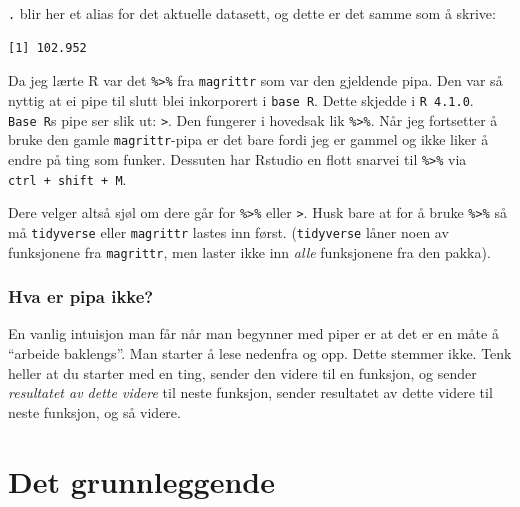 \documentclass[
  letterpaper,
  DIV=11,
  numbers=noendperiod]{scrreprt}
\newenvironment{Shaded}{\begin{snugshade}}{\end{snugshade}}
\newcommand{\FunctionTok}[1]{\textcolor[rgb]{0.28,0.35,0.67}{#1}}
\newcommand{\NormalTok}[1]{\textcolor[rgb]{0.00,0.23,0.31}{#1}}
\newcommand{\SpecialCharTok}[1]{\textcolor[rgb]{0.37,0.37,0.37}{#1}}
\begin{document}
\texttt{.} blir her et alias for det aktuelle datasett, og dette er det
samme som å skrive:

\begin{Shaded}
\end{Shaded}

\begin{verbatim}
[1] 102.952
\end{verbatim}

Da jeg lærte R var det \texttt{\%\textgreater{}\%} fra \texttt{magrittr}
som var den gjeldende pipa. Den var så nyttig at ei pipe til slutt blei
inkorporert i \texttt{base\ R}. Dette skjedde i \texttt{R\ 4.1.0}.
\texttt{Base\ R}s pipe ser slik ut: \texttt{\textbar{}\textgreater{}}.
Den fungerer i hovedsak lik \texttt{\%\textgreater{}\%}. Når jeg
fortsetter å bruke den gamle \texttt{magrittr}-pipa er det bare fordi
jeg er gammel og ikke liker å endre på ting som funker. Dessuten har
Rstudio en flott snarvei til \texttt{\%\textgreater{}\%} via
\texttt{ctrl\ +\ shift\ +\ M}.

Dere velger altså sjøl om dere går for \texttt{\%\textgreater{}\%} eller
\texttt{\textbar{}\textgreater{}}. Husk bare at for å bruke
\texttt{\%\textgreater{}\%} så må \texttt{tidyverse} eller
\texttt{magrittr} lastes inn først. (\texttt{tidyverse} låner noen av
funksjonene fra \texttt{magrittr}, men laster ikke inn \emph{alle}
funksjonene fra den pakka).

\hypertarget{hva-er-pipa-ikke}{%
\subsection{Hva er pipa ikke?}\label{hva-er-pipa-ikke}}

En vanlig intuisjon man får når man begynner med piper er at det er en
måte å ``arbeide baklengs''. Man starter å lese nedenfra og opp. Dette
stemmer ikke. Tenk heller at du starter med en ting, sender den videre
til en funksjon, og sender \emph{resultatet av dette videre} til neste
funksjon, sender resultatet av dette videre til neste funksjon, og så
videre.


\hypertarget{grunnleggende}{%
\chapter{Det grunnleggende}\label{grunnleggende}}
\end{document}
